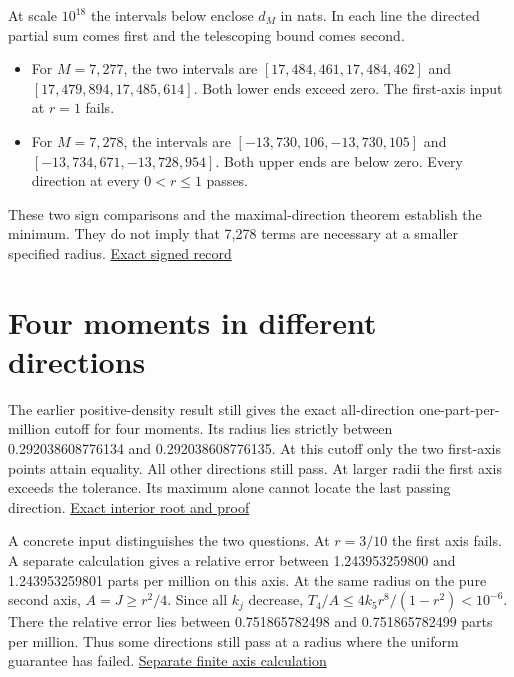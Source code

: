 At scale \(10^{18}\) the intervals below enclose \(d_M\) in nats. In each line the directed partial sum comes first and the telescoping bound comes second.

\begin{itemize}
\tightlist
\item
  For \(M=7{,}277\), the two intervals are \([17{,}484{,}461,17{,}484{,}462]\) and \([17{,}479{,}894,17{,}485{,}614]\). Both lower ends exceed zero. The first-axis input at \(r=1\) fails.
\item
  For \(M=7{,}278\), the intervals are \([-13{,}730{,}106,-13{,}730{,}105]\) and \([-13{,}734{,}671,-13{,}728{,}954]\). Both upper ends are below zero. Every direction at every \(0<r\le1\) passes.
\end{itemize}

These two sign comparisons and the maximal-direction theorem establish the minimum. They do not imply that 7,278 terms are necessary at a smaller specified radius. \href{https://github.com/sepahead/pid-rs/blob/main/audit/research/angular-unit-boundary/certificate.json}{Exact signed record}

\clearpage

\section{Four moments in different directions}\label{four-moments-in-different-directions}

The earlier positive-density result still gives the exact all-direction one-part-per-million cutoff for four moments. Its radius lies strictly between 0.292038608776134 and 0.292038608776135. At this cutoff only the two first-axis points attain equality. All other directions still pass. At larger radii the first axis exceeds the tolerance. Its maximum alone cannot locate the last passing direction. \href{https://github.com/sepahead/pid-rs/blob/ef705d1ed3410fd9fbbf4920cb4643f6a5140a2f/audit/research/angular-truncation-extremum/EXPOSITION.md}{Exact interior root and proof}

A concrete input distinguishes the two questions. At \(r=3/10\) the first axis fails. A separate calculation gives a relative error between 1.243953259800 and 1.243953259801 parts per million on this axis. At the same radius on the pure second axis, \(A=J\ge r^2/4\). Since all \(k_j\) decrease, \(T_4/A\le4k_5r^8/(1-r^2)<10^{-6}\). There the relative error lies between 0.751865782498 and 0.751865782499 parts per million. Thus some directions still pass at a radius where the uniform guarantee has failed. \href{https://github.com/sepahead/pid-rs/blob/main/audit/research/angular-unit-boundary/independent/four_directions.py}{Separate finite axis calculation}

